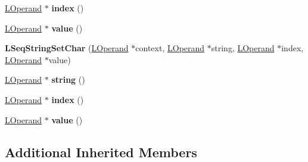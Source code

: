 \begin{DoxyCompactItemize}
\item 
\hyperlink{classv8_1_1internal_1_1_l_operand}{L\+Operand} $\ast$ {\bfseries index} ()\hypertarget{classv8_1_1internal_1_1_l_seq_string_set_char_ab3e762192555a55b62a9b438635a1178}{}\label{classv8_1_1internal_1_1_l_seq_string_set_char_ab3e762192555a55b62a9b438635a1178}

\item 
\hyperlink{classv8_1_1internal_1_1_l_operand}{L\+Operand} $\ast$ {\bfseries value} ()\hypertarget{classv8_1_1internal_1_1_l_seq_string_set_char_aeb1a6ce9adf8943da9ec22afe2b5af72}{}\label{classv8_1_1internal_1_1_l_seq_string_set_char_aeb1a6ce9adf8943da9ec22afe2b5af72}

\item 
{\bfseries L\+Seq\+String\+Set\+Char} (\hyperlink{classv8_1_1internal_1_1_l_operand}{L\+Operand} $\ast$context, \hyperlink{classv8_1_1internal_1_1_l_operand}{L\+Operand} $\ast$string, \hyperlink{classv8_1_1internal_1_1_l_operand}{L\+Operand} $\ast$index, \hyperlink{classv8_1_1internal_1_1_l_operand}{L\+Operand} $\ast$value)\hypertarget{classv8_1_1internal_1_1_l_seq_string_set_char_a719cac196a8e6c740c4055635b87f496}{}\label{classv8_1_1internal_1_1_l_seq_string_set_char_a719cac196a8e6c740c4055635b87f496}

\item 
\hyperlink{classv8_1_1internal_1_1_l_operand}{L\+Operand} $\ast$ {\bfseries string} ()\hypertarget{classv8_1_1internal_1_1_l_seq_string_set_char_a1fcee06e873470500f85a41f75bd0faa}{}\label{classv8_1_1internal_1_1_l_seq_string_set_char_a1fcee06e873470500f85a41f75bd0faa}

\item 
\hyperlink{classv8_1_1internal_1_1_l_operand}{L\+Operand} $\ast$ {\bfseries index} ()\hypertarget{classv8_1_1internal_1_1_l_seq_string_set_char_ab3e762192555a55b62a9b438635a1178}{}\label{classv8_1_1internal_1_1_l_seq_string_set_char_ab3e762192555a55b62a9b438635a1178}

\item 
\hyperlink{classv8_1_1internal_1_1_l_operand}{L\+Operand} $\ast$ {\bfseries value} ()\hypertarget{classv8_1_1internal_1_1_l_seq_string_set_char_aeb1a6ce9adf8943da9ec22afe2b5af72}{}\label{classv8_1_1internal_1_1_l_seq_string_set_char_aeb1a6ce9adf8943da9ec22afe2b5af72}

\end{DoxyCompactItemize}
\subsection*{Additional Inherited Members}


